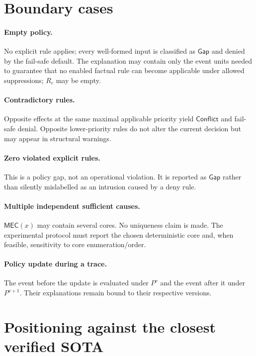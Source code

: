 \documentclass[11pt]{article}
\theoremstyle{remark}
\newcommand{\Conflict}{\mathsf{Conflict}}
\newcommand{\Gap}{\mathsf{Gap}}
\begin{document}
\section{Boundary cases}

\paragraph{Empty policy.}
No explicit rule applies; every well-formed input is classified as $\Gap$ and denied by the fail-safe default. The explanation may contain only the event units needed to guarantee that no enabled factual rule can become applicable under allowed suppressions; $R_c$ may be empty.

\paragraph{Contradictory rules.}
Opposite effects at the same maximal applicable priority yield $\Conflict$ and fail-safe denial. Opposite lower-priority rules do not alter the current decision but may appear in structural warnings.

\paragraph{Zero violated explicit rules.}
This is a policy gap, not an operational violation. It is reported as $\Gap$ rather than silently mislabelled as an intrusion caused by a deny rule.

\paragraph{Multiple independent sufficient causes.}
$\mathsf{MEC}(x)$ may contain several cores. No uniqueness claim is made. The experimental protocol must report the chosen deterministic core and, when feasible, sensitivity to core enumeration/order.

\paragraph{Policy update during a trace.}
The event before the update is evaluated under $P^v$ and the event after it under $P^{v+1}$. Their explanations remain bound to their respective versions.

\section{Positioning against the closest verified SOTA}
\end{document}

